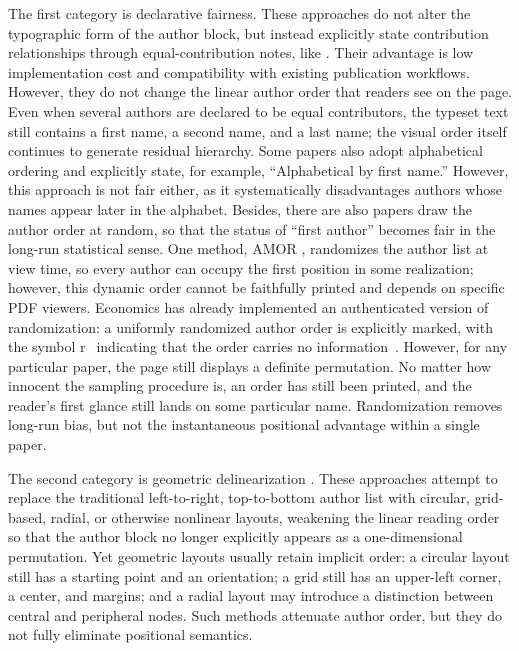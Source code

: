 \documentclass[10pt,letterpaper]{article}
\theoremstyle{definition}
\theoremstyle{remark}
\newcommand{\rsym}{\textcircled{\footnotesize r}}
\begin{document}
The first category is {declarative fairness}. These approaches do not alter the typographic form of the author block, but instead explicitly state contribution relationships through equal-contribution notes, like \cite{vaswani2017attention}. Their advantage is low implementation cost and compatibility with existing publication workflows. However, they do not change the linear author order that readers see on the page. Even when several authors are declared to be equal contributors, the typeset text still contains a first name, a second name, and a last name; the visual order itself continues to generate residual hierarchy.
Some papers also adopt alphabetical ordering and explicitly state, for example, “Alphabetical by first name.” However, this approach is not fair either, as it systematically disadvantages authors whose names appear later in the alphabet. 
Besides, there are also papers draw the author order at random, so that the status of “first author” becomes fair in the long-run statistical sense. One method, AMOR \cite{weiherer2024amor}, randomizes the author list at view time, so every author can occupy the first position in some realization; however, this dynamic order cannot be faithfully printed and depends on specific PDF viewers. Economics has already implemented an authenticated version of randomization: a uniformly randomized author order is explicitly marked, with the symbol \rsym\ indicating that the order carries no information~\cite{ray2018certified}. However, for any particular paper, the page still displays a definite permutation. No matter how innocent the sampling procedure is, an order has still been printed, and the reader's first glance still lands on some particular name. Randomization removes long-run bias, but not the instantaneous positional advantage within a single paper.

The second category is {geometric delinearization} \cite{demaine}. These approaches attempt to replace the traditional left-to-right, top-to-bottom author list with circular, grid-based, radial, or otherwise nonlinear layouts, weakening the linear reading order so that the author block no longer explicitly appears as a one-dimensional permutation. Yet geometric layouts usually retain implicit order: a circular layout still has a starting point and an orientation; a grid still has an upper-left corner, a center, and margins; and a radial layout may introduce a distinction between central and peripheral nodes. Such methods attenuate author order, but they do not fully eliminate positional semantics.
\end{document}
